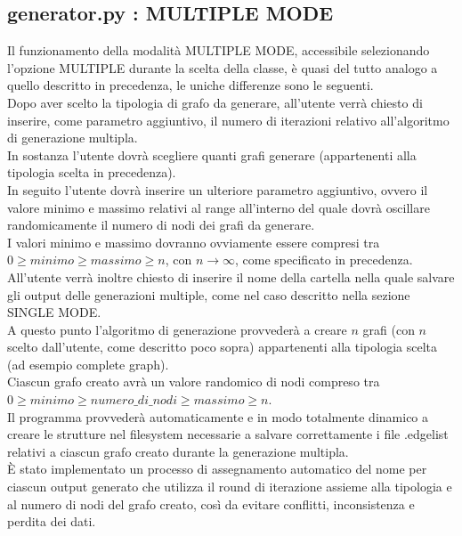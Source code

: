 \subsection{generator.py : MULTIPLE MODE}
\justify
Il funzionamento della modalità MULTIPLE MODE, accessibile selezionando l'opzione MULTIPLE durante la scelta della classe, è quasi del tutto analogo a quello descritto in precedenza, le uniche differenze sono le seguenti.\\

Dopo aver scelto la tipologia di grafo da generare, all'utente verrà chiesto di inserire, come parametro aggiuntivo, il numero di iterazioni relativo all'algoritmo di generazione multipla.\\
In sostanza l'utente dovrà scegliere quanti grafi generare (appartenenti alla tipologia scelta in precedenza).\\

In seguito l'utente dovrà inserire un ulteriore parametro aggiuntivo, ovvero il valore minimo e massimo relativi al range all'interno del quale dovrà oscillare randomicamente il numero di nodi dei grafi da generare.\\
I valori minimo e massimo dovranno ovviamente essere compresi tra \(0 \geq minimo \geq massimo \geq n\), con \(n\to\infty\), come specificato in precedenza.\\

All'utente verrà inoltre chiesto di inserire il nome della cartella nella quale salvare gli output delle generazioni multiple, come nel caso descritto nella sezione SINGLE MODE.\\

A questo punto l'algoritmo di generazione provvederà a creare \(n\) grafi (con \(n\) scelto dall'utente, come descritto poco sopra) appartenenti alla tipologia scelta (ad esempio complete graph).\\
Ciascun grafo creato avrà un valore randomico di nodi compreso tra \(0 \geq minimo \geq numero\_di\_nodi \geq massimo \geq n\).\\

Il programma provvederà automaticamente e in modo totalmente dinamico a creare le strutture nel filesystem necessarie a salvare correttamente i file .edgelist relativi a ciascun grafo creato durante la generazione multipla.\\
È stato implementato un processo di assegnamento automatico del nome per ciascun output generato che utilizza il round di iterazione assieme alla tipologia e al numero di nodi del grafo creato, così da evitare conflitti, inconsistenza e perdita dei dati.\\

